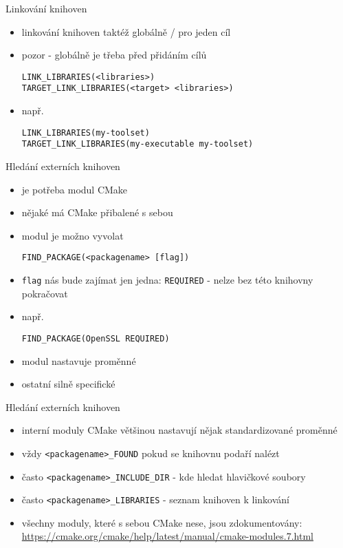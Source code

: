 \documentclass{beamer}
\begin{document}
\begin{xframe}{Linkování knihoven}
	\begin{itemize}
		\item linkování knihoven taktéž globálně / pro jeden cíl
		\item pozor - globálně je třeba před přidáním cílů
\begin{lstlisting}[basicstyle=\fontsize{8}{9}\selectfont\ttfamily]
LINK_LIBRARIES(<libraries>)
TARGET_LINK_LIBRARIES(<target> <libraries>)
\end{lstlisting}
		\item např.
\begin{lstlisting}[basicstyle=\fontsize{8}{9}\selectfont\ttfamily]
LINK_LIBRARIES(my-toolset)
TARGET_LINK_LIBRARIES(my-executable my-toolset)
\end{lstlisting}
	\end{itemize}
\end{xframe}

\begin{xframe}{Hledání externích knihoven}
	\begin{itemize}
		\item je potřeba modul CMake
		\item nějaké má CMake přibalené s sebou
		\item modul je možno vyvolat
\begin{lstlisting}[basicstyle=\fontsize{8}{9}\selectfont\ttfamily]
FIND_PACKAGE(<packagename> [flag])
\end{lstlisting}
		\item \texttt{flag} nás bude zajímat jen jedna: \texttt{REQUIRED} - nelze bez této knihovny pokračovat
		\item např.
\begin{lstlisting}[basicstyle=\fontsize{8}{9}\selectfont\ttfamily]
FIND_PACKAGE(OpenSSL REQUIRED)
\end{lstlisting}
		\item modul nastavuje proměnné
		\item ostatní silně specifické
	\end{itemize}
\end{xframe}

\begin{xframe}{Hledání externích knihoven}
	\begin{itemize}
		\item interní moduly CMake většinou nastavují nějak standardizované proměnné
		\item vždy \texttt{<packagename>\_FOUND} pokud se knihovnu podaří nalézt
		\item často \texttt{<packagename>\_INCLUDE\_DIR} - kde hledat hlavičkové soubory
		\item často \texttt{<packagename>\_LIBRARIES} - seznam knihoven k linkování
		\item všechny moduly, které s sebou CMake nese, jsou zdokumentovány: \url{https://cmake.org/cmake/help/latest/manual/cmake-modules.7.html}
	\end{itemize}
\end{xframe}
\end{document}

